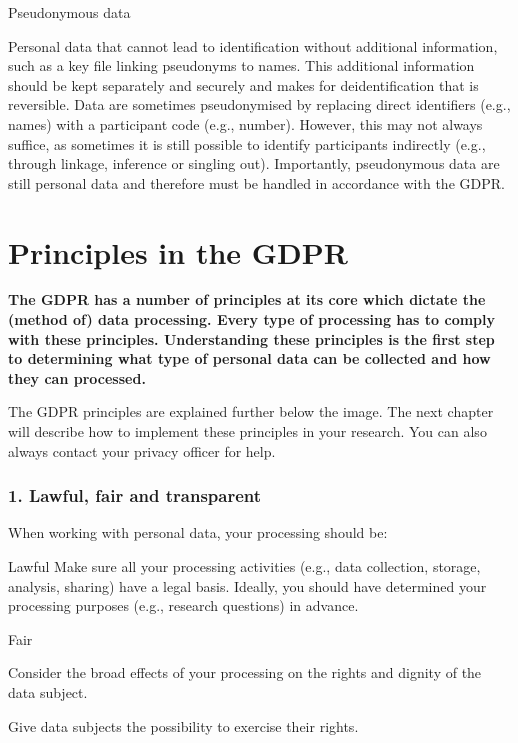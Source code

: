 \documentclass[
]{book}
\begin{document}
Pseudonymous data

Personal data that cannot lead to identification without additional information, such
as a key file linking pseudonyms to names. This additional information should be kept separately
and securely and makes for deidentification that is reversible. Data are sometimes pseudonymised
by replacing direct identifiers (e.g., names) with a participant code (e.g., number). However, this
may not always suffice, as sometimes it is still possible to identify participants indirectly
(e.g., through linkage, inference or singling out). Importantly, pseudonymous data are still
personal data and therefore must be handled in accordance with the GDPR.

\hypertarget{gdpr-principles}{%
\section*{Principles in the GDPR}\label{gdpr-principles}}

\textbf{The GDPR has a number of principles at its core which dictate the (method of) data processing.
Every type of processing has to comply with these principles. Understanding these principles is the
first step to determining what type of personal data can be collected and how they can processed.}

The GDPR principles are explained further below the image. The next chapter
will describe how to implement these principles in your research. You can also always contact your
privacy officer for help.

\hypertarget{lawful-fair-and-transparent}{%
\subsubsection{1. Lawful, fair and transparent}\label{lawful-fair-and-transparent}}

When working with personal data, your processing should be:

Lawful
Make sure all your processing activities (e.g., data collection, storage, analysis, sharing)
have a legal basis. Ideally, you should have determined your
processing purposes (e.g., research questions) in advance.

Fair

Consider the broad effects of your processing on the rights and dignity of the data subject.

Give data subjects the possibility to exercise their rights.
\end{document}
